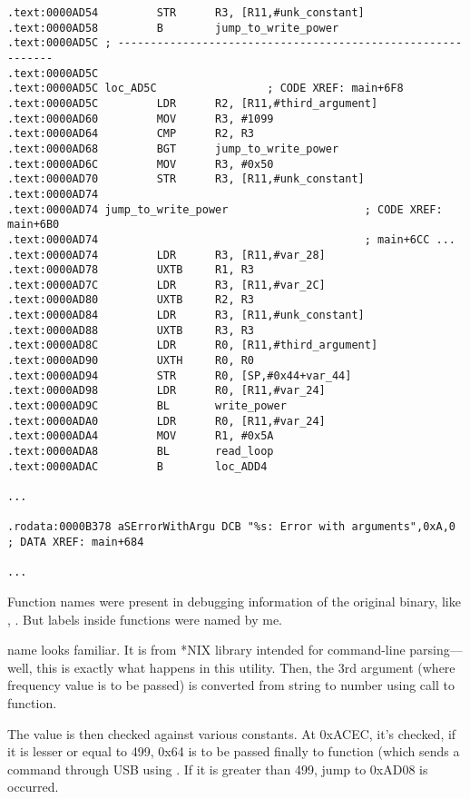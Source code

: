 \begin{lstlisting}
.text:0000AD54         STR      R3, [R11,#unk_constant]
.text:0000AD58         B        jump_to_write_power
.text:0000AD5C ; ------------------------------------------------------------
.text:0000AD5C
.text:0000AD5C loc_AD5C                 ; CODE XREF: main+6F8
.text:0000AD5C         LDR      R2, [R11,#third_argument]
.text:0000AD60         MOV      R3, #1099
.text:0000AD64         CMP      R2, R3
.text:0000AD68         BGT      jump_to_write_power
.text:0000AD6C         MOV      R3, #0x50
.text:0000AD70         STR      R3, [R11,#unk_constant]
.text:0000AD74
.text:0000AD74 jump_to_write_power                     ; CODE XREF: main+6B0
.text:0000AD74                                         ; main+6CC ...
.text:0000AD74         LDR      R3, [R11,#var_28]
.text:0000AD78         UXTB     R1, R3
.text:0000AD7C         LDR      R3, [R11,#var_2C]
.text:0000AD80         UXTB     R2, R3
.text:0000AD84         LDR      R3, [R11,#unk_constant]
.text:0000AD88         UXTB     R3, R3
.text:0000AD8C         LDR      R0, [R11,#third_argument]
.text:0000AD90         UXTH     R0, R0
.text:0000AD94         STR      R0, [SP,#0x44+var_44]
.text:0000AD98         LDR      R0, [R11,#var_24]
.text:0000AD9C         BL       write_power
.text:0000ADA0         LDR      R0, [R11,#var_24]
.text:0000ADA4         MOV      R1, #0x5A
.text:0000ADA8         BL       read_loop
.text:0000ADAC         B        loc_ADD4

...

.rodata:0000B378 aSErrorWithArgu DCB "%s: Error with arguments",0xA,0 ; DATA XREF: main+684

...

\end{lstlisting}

Function names were present in debugging information of the original binary, like , .
But labels inside functions were named by me.

 name looks familiar. It is from  *NIX library intended for command-line parsing---well, this is exactly what happens in this utility.
Then, the 3rd argument (where frequency value is to be passed) is converted from string to number using call to  function.

The value is then checked against various constants.
At 0xACEC, it's checked, if it is lesser or equal to 499, 0x64 is to be passed finally to  function (which sends a command through USB using .
If it is greater than 499, jump to 0xAD08 is occurred.


